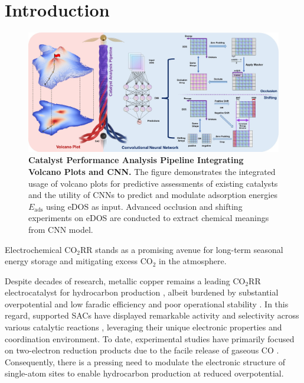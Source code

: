 

\section{Introduction}


\begin{figure}
    \centering
    \includegraphics[width=0.95\linewidth]{main_fig1_pipeline.JPG}
    \caption{\textbf{Catalyst Performance Analysis Pipeline Integrating Volcano Plots and CNN.}
    The figure demonstrates the integrated usage of volcano plots for predictive assessments of existing catalysts and the utility of CNNs to predict and modulate adsorption energies \(E_{\text{ads}}\) using eDOS as input.
    Advanced occlusion and shifting experiments on eDOS are conducted to extract chemical meanings from CNN model.}
    \label{main_fig1:pipeline}
\end{figure}


Electrochemical CO$_2$RR stands as a promising avenue for long-term seasonal energy storage \cite{dinh2018co2} and mitigating excess CO$_2$ in the atmosphere.

Despite decades of research, metallic copper remains a leading CO$_2$RR electrocatalyst for hydrocarbon production \cite{osella2023co2}, albeit burdened by substantial overpotential and low faradic efficiency and poor operational stability \cite{chen2019identifying, liu2021co2}.
In this regard, supported SACs have displayed remarkable activity and selectivity across various catalytic reactions \cite{wang2018heterogeneous, yang2018atomically}, leveraging their unique electronic properties and coordination environment.
To date, experimental studies have primarily focused on two-electron reduction products due to the facile release of gaseous CO \cite{cai2021insights, ju2017understanding, ren2019isolated}.
Consequently, there is a pressing need to modulate the electronic structure of single-atom sites to enable hydrocarbon production at reduced overpotential.

